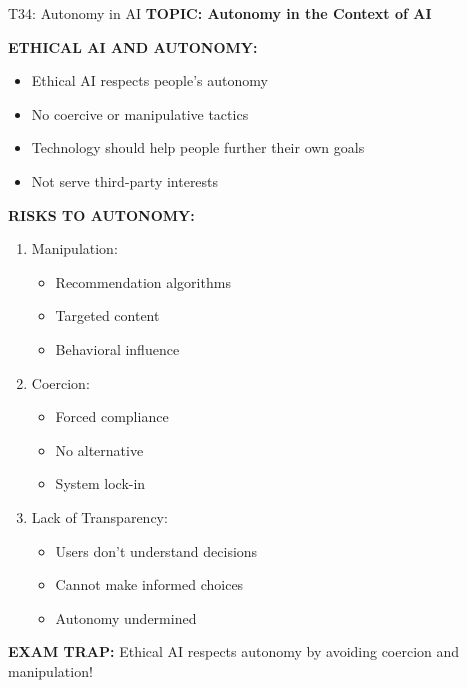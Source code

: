 \documentclass[8pt]{beamer}
\begin{document}
	\begin{frame}{T34: Autonomy in AI}
		\fontsize{6.5}{7.5}\selectfont
		\textbf{TOPIC: Autonomy in the Context of AI}
		
		\vspace{0.1cm}
		\textbf{ETHICAL AI AND AUTONOMY:}
		\begin{itemize}
			\item Ethical AI respects people's autonomy
			\item No coercive or manipulative tactics
			\item Technology should help people further their own goals
			\item Not serve third-party interests
		\end{itemize}
		
		\vspace{0.1cm}
		\textbf{RISKS TO AUTONOMY:}
		\begin{enumerate}
			\item \textcolor{myblue}{Manipulation:}
			\begin{itemize}
				\item Recommendation algorithms
				\item Targeted content
				\item Behavioral influence
			\end{itemize}
			\item \textcolor{myblue}{Coercion:}
			\begin{itemize}
				\item Forced compliance
				\item No alternative
				\item System lock-in
			\end{itemize}
			\item \textcolor{myblue}{Lack of Transparency:}
			\begin{itemize}
				\item Users don't understand decisions
				\item Cannot make informed choices
				\item Autonomy undermined
			\end{itemize}
		\end{enumerate}
		
		\textcolor{myred}{\textbf{EXAM TRAP:}} Ethical AI respects \textcolor{myblue}{autonomy by avoiding coercion and manipulation}!
	\end{frame}
	
\end{document}
